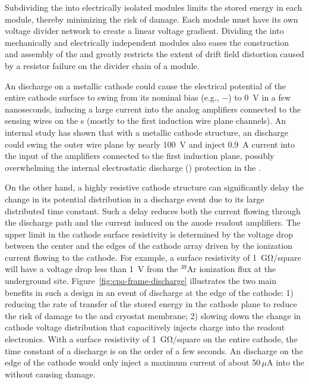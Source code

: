 Subdividing the  into electrically isolated modules limits the stored energy in each  module, thereby minimizing the risk of damage. Each  module must have its own voltage divider network to create a linear voltage gradient. Dividing the  into mechanically and electrically independent modules also eases the construction and assembly of the  and greatly restricts the extent of drift field distortion caused by a resistor failure on the divider chain of a  module.

An  discharge on a metallic cathode could cause the electrical potential of the entire cathode surface to swing from its nominal bias (e.g., $-$\sptargetdriftvoltpos) to \SI{0}{V} in a few nanoseconds, inducing a large current into the analog  amplifiers connected to the sensing wires on the s (mostly to the first induction wire plane channels). 
An internal study\cite{bib:docdb1320} has shown that with a metallic cathode structure, an  discharge could swing the outer wire plane by nearly \SI{100}{V} and inject \SI{0.9}{A} current into the input of the  amplifiers connected to the first induction plane, possibly overwhelming the internal electrostatic discharge () protection in the  .  


On the other hand, a highly resistive cathode structure can significantly delay the change in its potential distribution in a discharge event due to its large distributed  time constant. Such a delay reduces both the current flowing through the discharge path and the current induced on the anode readout amplifiers.  The upper limit in the cathode surface resistivity is 
determined by the voltage drop between the center and the edges of the cathode array driven by the ionization current flowing to the cathode.  For example, a surface resistivity of \SI{1}{\giga\ohm}/square  will have a voltage drop less than \SI{1}{V} from the $^{39}$Ar ionization flux at the underground site. Figure~\ref{fig:cpa-frame-discharge} illustrates the two main 
benefits in such a design in an event of  discharge at the edge of the cathode: 1) reducing the rate of transfer of the stored energy in the cathode plane to reduce the risk of damage to the  and cryostat membrane; 2) slowing down the change in cathode voltage distribution that capacitively injects charge into the readout electronics.
With a surface resistivity of \SI{1}{\giga\ohm}/square on the entire cathode, the time constant of a discharge is on the order of a few seconds. An  discharge on the edge of the cathode would only inject a maximum current of about 50\,$\mu$A into the   without causing damage.



